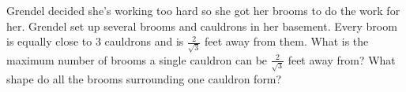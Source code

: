 


Grendel decided she's working too hard so she got her brooms to do the work for her. Grendel set up several brooms and cauldrons in her basement. Every broom is equally close to 3 cauldrons and is $\frac{2}{\sqrt{3}}$ feet away from them. What is the maximum number of brooms a single cauldron can be $\frac{2}{\sqrt{3}}$ feet away from? What shape do all the brooms surrounding one cauldron form?
